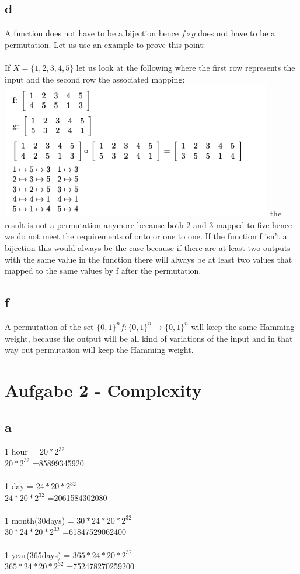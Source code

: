 \documentclass{article}
\theoremstyle{definition}
\theoremstyle{remark}
\begin{document}
\subsection*{d}
A function does not have to be a bijection hence $f\circ g$ does not have to be a permutation. Let us use an example to prove this point:\\\\
If $X = \{1,2,3,4,5\}$ let us look at the following where the first row represents the input and the second row the associated mapping:\\
\includegraphics[width=450px]{Task1d.png}
the result is not a permutation anymore because both 2 and 3 mapped to five hence we do not meet the requirements of onto or one to one. If the function f isn’t a bijection this would always be the case because if there are at least two outputs with the same value in the function there will always be at least two values that mapped to the same values by f after the permutation.
\subsection*{f}
A permutation of the set $\{0, 1\}^n f : \{0, 1\}^n \to \{0, 1\}^n$ will keep the same Hamming weight, because the output will be all kind of variations of the input and in that way out permutation will keep the Hamming weight.
\section*{Aufgabe 2 - Complexity}
\subsection*{a}
1 hour = $20*2^{32}$\\
$20*2^{32}$ =85899345920\\\\
1 day = $24*20*2^{32}$ \\
$24*20*2^{32}$ =2061584302080\\\\
1 month(30days) = $30*24*20*2^{32}$\\
$30*24*20*2^{32}$ =61847529062400\\\\
1 year(365days) = $365*24*20*2^{32}$\\
$365*24*20*2^{32}$ =752478270259200\\
\end{document}
